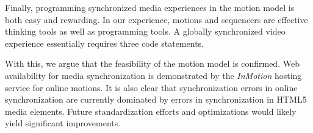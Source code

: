 Finally, programming synchronized media experiences in the motion model is
both easy and rewarding. In our experience, motions and sequencers are
effective thinking tools as well as programming tools. A globally synchronized
video experience essentially requires three code statements.

With this, we argue that the feasibility of the motion model is confirmed. Web
availability for media synchronization is demonstrated by the \emph{InMotion} hosting
service for online motions. It is also clear that synchronization errors in
online synchronization are currently dominated by errors in synchronization in
HTML5 media elements. Future standardization efforts and optimizations would
likely yield significant improvements.




